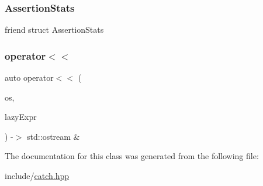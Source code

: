 \mbox{\label{classCatch_1_1LazyExpression_a64019eb137f5ce447cdc71cb80b6e7a4}} 
\subsubsection{\texorpdfstring{Assertion\+Stats}{AssertionStats}}
{\footnotesize\ttfamily friend struct Assertion\+Stats\hspace{0.3cm}{\ttfamily [friend]}}

\mbox{\label{classCatch_1_1LazyExpression_aa01086581cab2fcd2d4580b8fa787dfc}} 
\subsubsection{\texorpdfstring{operator$<$$<$}{operator<<}}
{\footnotesize\ttfamily auto operator$<$$<$ (\begin{DoxyParamCaption}\item[{std\+::ostream \&}]{os,  }\item[{\mbox{\hyperlink{classCatch_1_1LazyExpression}{Lazy\+Expression}} const \&}]{lazy\+Expr }\end{DoxyParamCaption}) -\/$>$  std\+::ostream \&\hspace{0.3cm}{\ttfamily [friend]}}



The documentation for this class was generated from the following file\+:\begin{DoxyCompactItemize}
\item 
include/\mbox{\hyperlink{catch_8hpp}{catch.\+hpp}}\end{DoxyCompactItemize}
